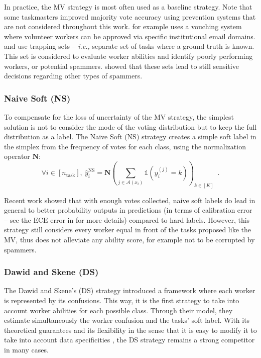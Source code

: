 In practice, the MV strategy is most often used as a baseline strategy.
Note that some taskmasters improved majority vote accuracy using prevention systems that are not considered throughout this work.
\citet{hoang2021tournesol} for example uses a vouching system where volunteer workers can be approved via specific institutional email domains.
\citet{khattak_toward_2017} and \citet{peterson_human_2019} use trapping sets -- \emph{i.e.,} separate set of tasks where a ground truth is known. This set is considered to evaluate worker abilities and identify poorly performing workers, or potential spammers. \citet{vuurens2011much} showed that these sets lead to still sensitive decisions regarding other types of spammers.

\subsubsection{Naive Soft (NS)}
\label{subsub:ns}

To compensate for the loss of uncertainty of the MV strategy, the simplest solution is not to consider the mode of the voting distribution but to keep the full distribution as a label.
The Naive Soft (NS) strategy creates a simple soft label in the simplex from the frequency of votes for each class, using the normalization operator $\mathbf{N}$:
\begin{equation}\label{eq:ns}
    \forall i\in [n_\text{task}],\ \hat y_i^{\mathrm{NS}} = \mathbf{N}\left(\sum_{j\in\mathcal{A}(x_i)} \mathds{1}(y_i^{(j)}=k)\right)_{k\in[K]} \enspace.
\end{equation}

Recent work \citep{collins2022eliciting} showed that with enough votes collected, naive soft labels do lead in general to better probability outputs in predictions (in terms of calibration error -- see the $\mathrm{ECE}$ error in  for more details) compared to hard labels.
However, this strategy still considers every worker equal in front of the tasks proposed like the MV, thus does not alleviate any ability score, for example not to be corrupted by spammers.

\subsubsection{Dawid and Skene (DS)}
\label{subsub:ds}

The Dawid and Skene's (DS) strategy \citep{dawid_maximum_1979} introduced a framework where each worker is represented by its confusions.
This way, it is the first strategy to take into account worker abilities for each possible class.
Through their model, they estimate simultaneously the worker confusion and the tasks' soft label.
With its theoretical guarantees \citep{gao2013minimax} and its flexibility in the sense that it is easy to modify it to take into account data specificities \citep{passonneau-carpenter-2014-benefits, servajean2017crowdsourcing,sinha2018fast}, the DS strategy remains a strong competitor in many cases.


